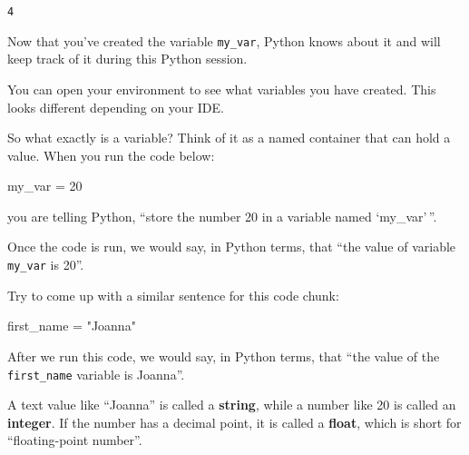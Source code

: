 \documentclass[
  letterpaper,
  DIV=11,
  numbers=noendperiod]{scrreprt}
\newenvironment{Shaded}{\begin{snugshade}}{\end{snugshade}}
\newcommand{\DecValTok}[1]{\textcolor[rgb]{0.68,0.00,0.00}{#1}}
\newcommand{\NormalTok}[1]{\textcolor[rgb]{0.00,0.23,0.31}{#1}}
\newcommand{\OperatorTok}[1]{\textcolor[rgb]{0.37,0.37,0.37}{#1}}
\newcommand{\StringTok}[1]{\textcolor[rgb]{0.13,0.47,0.30}{#1}}
\begin{document}
\begin{verbatim}
4
\end{verbatim}

Now that you've created the variable \texttt{my\_var}, Python knows
about it and will keep track of it during this Python session.

You can open your environment to see what variables you have created.
This looks different depending on your IDE.

So what exactly is a variable? Think of it as a named container that can
hold a value. When you run the code below:

\begin{Shaded}
\begin{Highlighting}[]
\NormalTok{my\_var }\OperatorTok{=} \DecValTok{20}
\end{Highlighting}
\end{Shaded}

you are telling Python, ``store the number 20 in a variable named
`my\_var'\,''.

Once the code is run, we would say, in Python terms, that ``the value of
variable \texttt{my\_var} is 20''.

Try to come up with a similar sentence for this code chunk:

\begin{Shaded}
\begin{Highlighting}[]
\NormalTok{first\_name }\OperatorTok{=} \StringTok{"Joanna"}
\end{Highlighting}
\end{Shaded}

After we run this code, we would say, in Python terms, that ``the value
of the \texttt{first\_name} variable is Joanna''.

\begin{tcolorbox}[enhanced jigsaw, colframe=quarto-callout-note-color-frame, opacityback=0, titlerule=0mm, bottomrule=.15mm, breakable, leftrule=.75mm, colbacktitle=quarto-callout-note-color!10!white, title=\textcolor{quarto-callout-note-color}{\faInfo}\hspace{0.5em}{Vocab}, rightrule=.15mm, coltitle=black, opacitybacktitle=0.6, colback=white, left=2mm, arc=.35mm, toptitle=1mm, bottomtitle=1mm, toprule=.15mm]

A text value like ``Joanna'' is called a \textbf{string}, while a number
like 20 is called an \textbf{integer}. If the number has a decimal
point, it is called a \textbf{float}, which is short for
``floating-point number''.

\end{tcolorbox}
\end{document}
